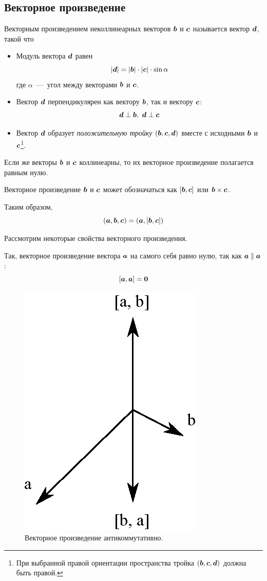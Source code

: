 \documentclass[a4paper,12pt]{article}
\begin{document}
  \subsection{Векторное произведение}
  
  \begin{definition}
    Векторным произведением неколлинеарных векторов $\boldsymbol b$ и $\boldsymbol c$ называется вектор $\boldsymbol d$, такой что
    \begin{itemize}
      \item Модуль вектора $\boldsymbol d$ равен
      \[
        |\boldsymbol d| = |\boldsymbol b| \cdot |\boldsymbol c| \cdot \sin\alpha
      \]
      где $\alpha$~---~угол между векторами $\boldsymbol b$ и $\boldsymbol c$.
      
      \item Вектор $\boldsymbol d$ перпендикулярен как вектору $\boldsymbol b$, так и вектору $\boldsymbol c$:
      \[
        \boldsymbol d \perp \boldsymbol b,\ \boldsymbol d \perp \boldsymbol c
      \]
      
      \item Вектор $\boldsymbol d$ образует \emph{положительную тройку} $(\boldsymbol b, \boldsymbol c, \boldsymbol d)$ вместе с исходными $\boldsymbol b$ и $\boldsymbol c$\footnote{При выбранной правой ориентации пространства тройка $(\boldsymbol b, \boldsymbol c, \boldsymbol d)$ должна быть правой.}.
    \end{itemize}
    
    Если же векторы $\boldsymbol b$ и $\boldsymbol c$ коллинеарны, то их векторное произведение полагается равным нулю.
    
    Векторное произведение $\boldsymbol b$ и $\boldsymbol c$ может обозначаться как $[\boldsymbol b, \boldsymbol c]$ или $\bds b \hm\times \bds c$.
  \end{definition}
  
  Таким образом,
  \begin{equation}\label{eq:triple-as-scalar-and-vector}
    (\boldsymbol a, \boldsymbol b, \boldsymbol c) = (\boldsymbol a, [\boldsymbol b, \boldsymbol c])
  \end{equation}
  
  Рассмотрим некоторые свойства векторного произведения.
  
  Так, векторное произведение вектора $\boldsymbol a$ на самого себя равно нулю, так как $\bds a \hm\parallel \bds a$:
  \[
    [\boldsymbol a, \boldsymbol a] = \boldsymbol 0
  \]
  
  \begin{figure}[h]
    \centering
    
    \includegraphics[width=0.25\columnwidth]{ab-ba}
    
    \caption{Векторное произведение антикоммутативно.}
    \label{fig:ab-ba}
  \end{figure}
    
\end{document}

